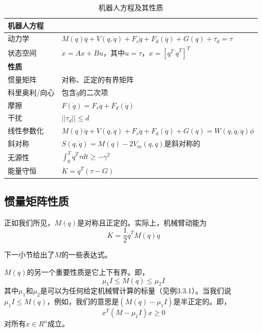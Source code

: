 \documentclass[12pt,a4paper]{ctexart}
\begin{document}
\begin{table}[htbp]
\centering
\caption{机器人方程及其性质}
\begin{tabular}{|l|l|}
\hline
\textbf{机器人方程} & \\
\hline
动力学 & $M(q)\ddot{q} + V(q,\dot{q}) + F_v\dot{q} + F_d(\dot{q}) + G(q) + \tau_d = \tau$ \\
\hline
状态空间 & $\dot{x} = Ax + Bu$，其中$u = \tau$，$x = [q^T \ \dot{q}^T]^T$ \\
\hline
\textbf{性质} & \\
\hline
惯量矩阵 & 对称、正定的有界矩阵 \\
\hline
科里奥利/向心 & 包含$\dot{q}$的二次项 \\
\hline
摩擦 & $F(\dot{q}) = F_v\dot{q} + F_d(\dot{q})$ \\
\hline
干扰 & $||\tau_d|| \leq d$ \\
\hline
线性参数化 & $M(q)\ddot{q} + V(q,\dot{q}) + F_v\dot{q} + F_d(\dot{q}) + G(q) = W(q,\dot{q},\ddot{q})\phi$ \\
\hline
斜对称 & $S(q,\dot{q}) = \dot{M}(q) - 2V_m(q,\dot{q})$是斜对称的 \\
\hline
无源性 & $\int_0^T \dot{q}^T\tau dt \geq -\gamma^2$ \\
\hline
能量守恒 & $\dot{K} = \dot{q}^T(\tau - G)$ \\
\hline
\end{tabular}
\end{table}

\subsection{惯量矩阵性质}

正如我们所见，$M(q)$是对称且正定的。实际上，机械臂动能为
\begin{equation}
K = \frac{1}{2}\dot{q}^T M(q) \dot{q}
\end{equation}

下一小节给出了$M$的一些表达式。

$M(q)$的另一个重要性质是它上下有界。即，
\begin{equation}
\mu_1 I \leq M(q) \leq \mu_2 I
\end{equation}
其中$\mu_1$和$\mu_2$是可以为任何给定机械臂计算的标量（见例3.3.1）。当我们说$\mu_1 I \leq M(q)$，例如，我们的意思是$(M(q) - \mu_1 I)$是半正定的。即，
\begin{equation}
x^T(M - \mu_1 I)x \geq 0
\end{equation}
对所有$x \in R^n$成立。
\end{document}
